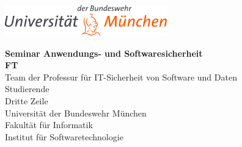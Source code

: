 \thispagestyle{empty}
\vspace*{-2ex}

\centerline{\includegraphics[width=7cm]{pics/athene.png}}
\vspace{4cm}

\begin{center}

{\huge\textbf{Seminar Anwendungs- und Softwaresicherheit}}\\[1cm]
{\large\textbf{FT \the\year{}}}\\[1cm]
            

\vspace*{2,8cm}
Team der Professur für IT-Sicherheit von Software und Daten\\
Studierende\\
Dritte Zeile\\[8cm]

Universit\"at der Bundeswehr M\"unchen\\
Fakult\"at f\"ur Informatik\\
Institut f\"ur Softwaretechnologie\\

\end{center}
